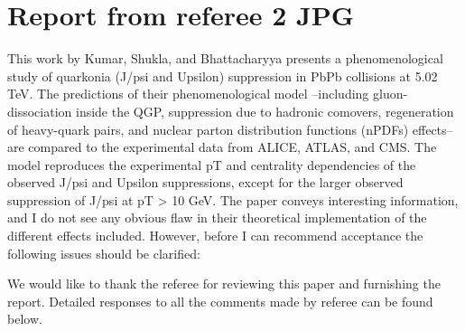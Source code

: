 \documentclass[a4paper,11pt]{article}
\begin{document}


\section*{Report from referee 2 JPG}

This work by Kumar, Shukla, and Bhattacharyya presents a phenomenological study of 
quarkonia (J/psi and Upsilon) suppression in PbPb collisions at  5.02 TeV. 
The predictions of their phenomenological model --including gluon-dissociation 
inside the QGP, suppression due to hadronic comovers, regeneration of heavy-quark 
pairs, and nuclear parton distribution functions (nPDFs) effects-- are compared 
to the experimental data from ALICE, ATLAS, and CMS. The model reproduces the 
experimental pT and centrality dependencies of the observed J/psi and Upsilon 
suppressions, except for the larger observed suppression of J/psi at pT > 10 GeV. 
The paper conveys interesting information, and I do not see any obvious flaw in 
their theoretical implementation of the different effects included. However, 
before I can recommend acceptance the following issues should be clarified:
\newline




{\color{blue}
We would like to thank the referee for reviewing this paper and furnishing the report.
Detailed responses to all the comments made by referee can be found below.}
\end{document}
